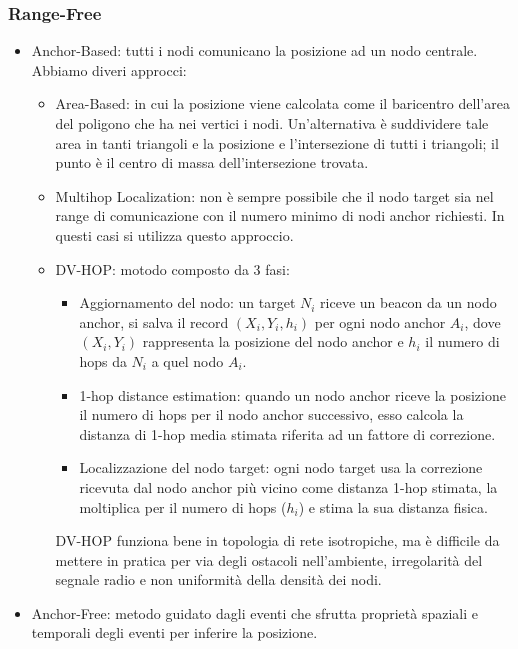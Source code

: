 \documentclass[12pt,a4paper]{article}
\begin{document}
	\subsubsection{Range-Free}\label{subsubsec3.4.2}
	\begin{itemize}
		\item Anchor-Based: tutti i nodi comunicano la posizione ad un nodo centrale. Abbiamo diveri approcci:
		\begin{itemize}
			\item Area-Based: in cui la posizione viene calcolata come il baricentro dell'area del poligono che ha nei vertici i nodi. Un'alternativa è suddividere tale area in tanti triangoli e la posizione e l'intersezione di tutti i triangoli; il punto è il centro di massa dell'intersezione trovata.
			\item Multihop Localization: non è sempre possibile che il nodo target sia nel range di comunicazione con il numero minimo di nodi anchor richiesti. In questi casi si utilizza questo approccio.
			\item DV-HOP: motodo composto da 3 fasi:
			\begin{itemize}
				\item Aggiornamento del nodo: un target $N_i$ riceve un beacon da un nodo anchor, si salva il record $(X_i, Y_i, h_i)$ per ogni nodo anchor $A_i$, dove $(X_i, Y_i)$ rappresenta la posizione del nodo anchor e $h_i$ il numero di hops da $N_i$ a quel nodo $A_i$.
				\item 1-hop distance estimation: quando un nodo anchor riceve la posizione il numero di hops per il nodo anchor successivo, esso calcola la distanza di 1-hop media stimata riferita ad un fattore di correzione.
				\item Localizzazione del nodo target: ogni nodo target usa la correzione ricevuta dal nodo anchor più vicino come distanza 1-hop stimata, la moltiplica per il numero di hops ($h_i$) e stima la sua distanza fisica.
			\end{itemize}
			DV-HOP funziona bene in topologia di rete isotropiche, ma è difficile da mettere in pratica per via degli ostacoli nell'ambiente, irregolarità del segnale radio e non uniformità della densità dei nodi.
		\end{itemize}
		\item Anchor-Free: metodo guidato dagli eventi che sfrutta proprietà spaziali e temporali degli eventi per inferire la posizione.
	\end{itemize}
	
	\newpage
\end{document}

